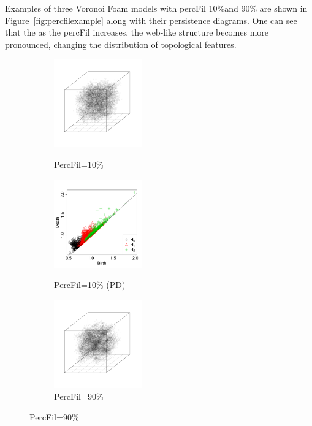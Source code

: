 \documentclass[12pt]{article}
\newcommand{\figref}[1]{Figure~\ref{#1}}
\begin{document}
Examples of three Voronoi Foam models with percFil 10\%and 90\% are shown in \figref{fig:percfilexample} along with their persistence diagrams. One can see that the as the percFil increases, the web-like structure becomes more pronounced, changing the distribution of topological features.
\begin{center}
  \begin{figure}[htp!]
    \centering
    \begin{subfigure}{.24\textwidth}
      \centering
      \caption{PercFil=10\%}
      \includegraphics[height=1.5in]{figure_7_plot_pf_0_1.pdf}
      \label{fig:percfil01voronoi}
    \end{subfigure}
    \begin{subfigure}{.24\textwidth}
      \centering
      \caption{PercFil=10\% (PD)}
      \includegraphics[height=1.5in]{figure_7_pd_0_1.pdf}
      \label{fig:percfil01pd}
    \end{subfigure}
    \begin{subfigure}{.24\textwidth}
      \centering
      \caption{PercFil=90\%}
      \includegraphics[height=1.5in]{figure_7_plot_pf_0_9.pdf}

\end{subfigure}
\end{figure}
\end{center}
\end{document}
